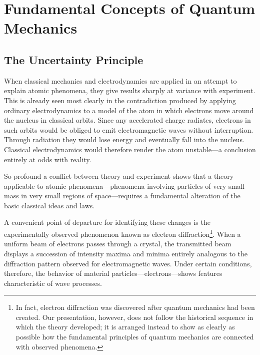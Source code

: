 \chapter{Fundamental Concepts of Quantum Mechanics}

\section{The Uncertainty Principle}

When classical mechanics and electrodynamics are applied in an attempt to
explain atomic phenomena, they give results sharply at variance with
experiment. This is already seen most clearly in the contradiction produced
by applying ordinary electrodynamics to a model of the atom in which electrons
move around the nucleus in classical orbits. Since any accelerated charge radiates, electrons
in such orbits would be obliged to emit electromagnetic waves without
interruption. Through radiation they would lose energy
and eventually fall into the nucleus. Classical electrodynamics would therefore render the atom
unstable---a conclusion entirely at odds with reality.

So profound a conflict between theory and experiment shows that a theory
applicable to atomic phenomena---phenomena involving particles of very small
mass in very small regions of space---requires a fundamental alteration of
the basic classical ideas and laws.

A convenient point of departure for identifying these changes is the
experimentally observed phenomenon known as electron diffraction\footnote{In
fact, electron diffraction was discovered after quantum mechanics had been
created. Our presentation, however, does not follow the historical sequence
in which the theory developed; it is arranged instead to show as clearly as
possible how the fundamental principles of quantum mechanics are connected
with observed phenomena.}. When a uniform beam of electrons passes through a
crystal, the transmitted beam displays a succession of intensity maxima and
minima entirely analogous to the diffraction pattern observed for
electromagnetic waves. Under certain conditions, therefore, the behavior of
material particles---electrons---shows features characteristic of wave
processes.

